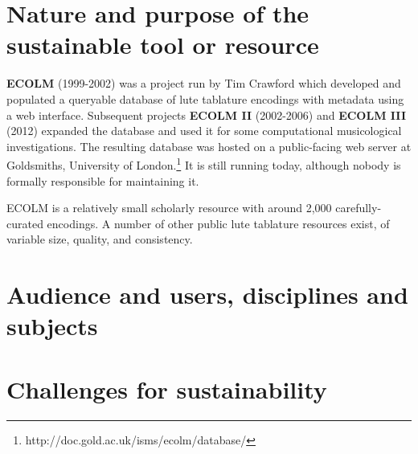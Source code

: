 \documentclass[sigconf]{acmart}
\begin{document}
\maketitle
\begin{sloppypar}


  \section{Nature and purpose of the sustainable tool or resource}

  {\bf ECOLM} (1999-2002) was a project run by Tim Crawford which
  developed and populated a queryable database of lute tablature
  encodings with metadata using a web interface. Subsequent projects
  {\bf ECOLM II} (2002-2006) and {\bf ECOLM III} (2012) expanded the
  database and used it for some computational musicological
  investigations. The resulting database was hosted on a public-facing
  web server at Goldsmiths, University of
  London.\footnote{http://doc.gold.ac.uk/isms/ecolm/database/} It is
  still running today, although nobody is formally responsible for
  maintaining it.

  ECOLM is a relatively small scholarly resource with around 2,000
  carefully-curated encodings. A number of other public lute tablature
  resources exist, of variable size, quality, and consistency.
  
  \section{Audience and users, disciplines and subjects}
  
  \section{Challenges for sustainability}


\end{sloppypar}
\end{document}
